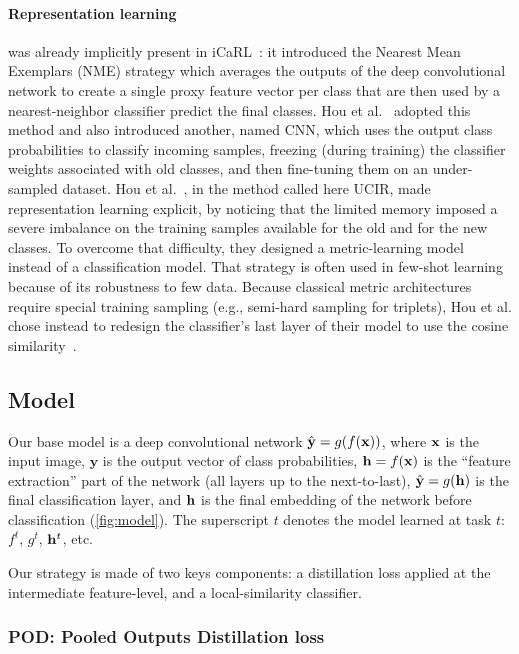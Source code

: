 \paragraph{Representation learning} was already implicitly present in
iCaRL~\citep{rebuffi2017icarl}: it introduced the Nearest Mean Exemplars (NME) strategy which
averages the outputs of the deep convolutional network to create a single proxy feature vector per
class that are then used by a nearest-neighbor classifier predict the final classes. Hou et
al.~\citep{hou2019ucir} adopted this method and also introduced another, named CNN, which uses the
output class probabilities to classify incoming samples, freezing (during training) the classifier
weights associated with old classes, and then fine-tuning them on an under-sampled dataset. Hou et
al.~\citep{hou2019ucir}, in the method called here UCIR, made representation learning explicit, by
noticing that the limited memory imposed a severe imbalance on the training samples available for
the old and for the new classes. To overcome that difficulty, they designed a metric-learning model
instead of a classification model. That strategy is often used in few-shot
learning~\citep{gidaris2018fewshot_wo_forgetting} because of its robustness to few data. Because
classical metric architectures require special training sampling (e.g., semi-hard sampling for
triplets), Hou et al. chose instead to redesign the classifier's last layer of their model to use
the cosine similarity~\citep{luo2018cosine_classifier}.


\subsection{Model}
\label{sec:podnet_model}

Our base model is a deep convolutional network $\hat{\mathbf{y}} = g(f(\mathbf{x}))$, where $\mathbf{x}$ is the input image,
$\mathbf{y}$ is the output vector of class probabilities, $\mathbf{h} = f(\mathbf{x})$ is the ``feature
extraction'' part of the network (all layers up to the next-to-last), $\hat{\mathbf{y}} = g(\mathbf{h})$ is the final
classification layer, and $\mathbf{h}$ is the final embedding of the network before classification
(\autoref{fig:model}). The superscript $t$ denotes the model learned at task $t$:$f^{t}$, $g^{t}$,
$\mathbf{h}^{t}$, etc.

Our strategy is made of two keys components: a distillation loss applied at the intermediate
feature-level, and a local-similarity classifier.

\subsubsection{POD: Pooled Outputs Distillation loss}
\label{sec:podnet_pod}

